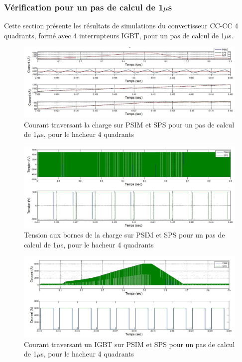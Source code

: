 \subsubsection{Vérification pour un pas de calcul de 1$\mu$s}
Cette section présente les résultats de simulations du convertisseur CC-CC 4 quadrants, formé avec 4 interrupteurs IGBT, pour un pas de calcul de 1$\mu$s. 


\begin{figure}[htb]
\centering
\includegraphics[scale=0.5]{fig/Hacheur4Quadrants/HacheurCourantCharge1u.jpg}
\caption{Courant traversant la charge sur PSIM et SPS pour un pas de calcul de 1$\mu$s, pour le hacheur 4 quadrants}
\label{hc_cou_ch_1}
\end{figure}


\begin{figure}[htb]
\centering
\includegraphics[scale=0.5]{fig/Hacheur4Quadrants/HacheurTensionCharge1u.jpg}
\caption{Tension aux bornes de la charge sur PSIM et SPS pour un pas de calcul de 1$\mu$s, pour le hacheur 4 quadrants}
\label{hc_ten_ch_1}
\end{figure}


\begin{figure}[htb]
\centering
\includegraphics[scale=0.5]{fig/Hacheur4Quadrants/HacheurCourantIGBT1u.jpg}
\caption{Courant traversant un IGBT sur PSIM et SPS pour un pas de calcul de 1$\mu$s, pour le hacheur 4 quadrants}
\label{hc_IG_cou_1}
\end{figure}

